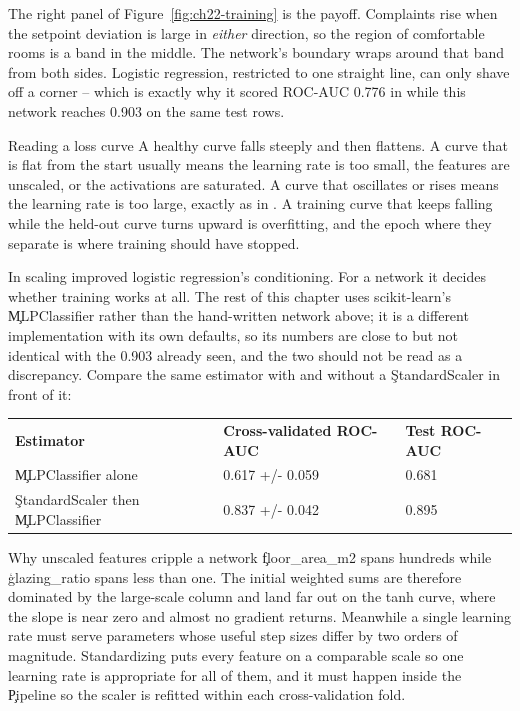 The right panel of Figure~\ref{fig:ch22-training} is the payoff. Complaints rise
when the setpoint deviation is large in \emph{either} direction, so the region of
comfortable rooms is a band in the middle. The network's boundary wraps around
that band from both sides. Logistic regression, restricted to one straight line,
can only shave off a corner -- which is exactly why it scored ROC-AUC 0.776 in
 while this network reaches 0.903 on the same test
rows.

\begin{ExplainBox}{Reading a loss curve}
A healthy curve falls steeply and then flattens. A curve that is flat from the
start usually means the learning rate is too small, the features are unscaled, or
the activations are saturated. A curve that oscillates or rises means the
learning rate is too large, exactly as in . A
training curve that keeps falling while the held-out curve turns upward is
overfitting, and the epoch where they separate is where training should have
stopped.
\end{ExplainBox}


In  scaling improved logistic regression's
conditioning. For a network it decides whether training works at all. The rest
of this chapter uses scikit-learn's \c{MLPClassifier} rather than the
hand-written network above; it is a different implementation with its own
defaults, so its numbers are close to but not identical with the 0.903 already
seen, and the two should not be read as a discrepancy. Compare the same
estimator with and without a \c{StandardScaler} in front of it:

\begin{center}
\begin{tabular}{lll}
\textbf{Estimator} & \textbf{Cross-validated ROC-AUC} & \textbf{Test ROC-AUC} \\
\c{MLPClassifier} alone & 0.617 +/- 0.059 & 0.681 \\
\c{StandardScaler} then \c{MLPClassifier} & 0.837 +/- 0.042 & 0.895 \\
\end{tabular}
\end{center}

\begin{ExplainBox}{Why unscaled features cripple a network}
\c{floor_area_m2} spans hundreds while \c{glazing_ratio} spans less than one. The
initial weighted sums are therefore dominated by the large-scale column and land
far out on the tanh curve, where the slope is near zero and almost no gradient
returns. Meanwhile a single learning rate must serve parameters whose useful step
sizes differ by two orders of magnitude. Standardizing puts every feature on a
comparable scale so one learning rate is appropriate for all of them, and it must
happen inside the \c{Pipeline} so the scaler is refitted within each
cross-validation fold.
\end{ExplainBox}

